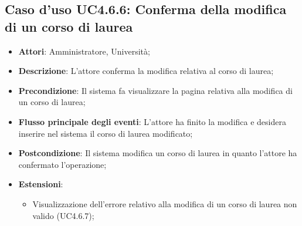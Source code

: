\subsection{Caso d'uso \texorpdfstring{UC4.6.6}{UC4.6.6}: Conferma della modifica di un corso di laurea}
\begin{itemize}
	\item \textbf{Attori}: Amministratore, Università;
	\item \textbf{Descrizione}: L'attore conferma la modifica relativa al corso di laurea;
	
	\item \textbf{Precondizione}: Il sistema fa visualizzare la pagina relativa alla modifica di un corso di laurea;
	
	
	\item \textbf{Flusso principale degli eventi}: L'attore ha finito la modifica e desidera inserire nel sistema il corso di laurea modificato;
	
	\item \textbf{Postcondizione}: Il sistema modifica un corso di laurea in quanto l'attore ha confermato l'operazione;
	
	\item \textbf{Estensioni}:
	\begin{itemize}
		\item Visualizzazione dell'errore relativo alla modifica di un corso di laurea non valido (UC4.6.7);
	\end{itemize}
\end{itemize}
